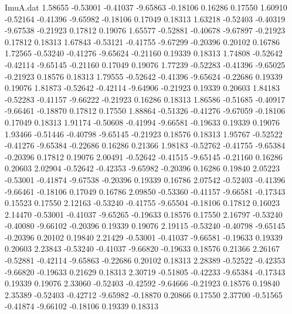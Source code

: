\begin{filecontents}{ImuA.dat}
   1.58655   -0.53001   -0.41037   -9.65863   -0.18106    0.16286    0.17550
   1.60910   -0.52164   -0.41396   -9.65982   -0.18106    0.17049    0.18313
   1.63218   -0.52403   -0.40319   -9.67538   -0.21923    0.17812    0.19076
   1.65577   -0.52881   -0.40678   -9.67897   -0.21923    0.17812    0.18313
   1.67843   -0.53121   -0.41755   -9.67299   -0.20396    0.20102    0.16786
   1.72565   -0.53240   -0.41276   -9.65624   -0.21160    0.19339    0.18313
   1.74808   -0.52642   -0.42114   -9.65145   -0.21160    0.17049    0.19076
   1.77239   -0.52283   -0.41396   -9.65025   -0.21923    0.18576    0.18313
   1.79555   -0.52642   -0.41396   -9.65624   -0.22686    0.19339    0.19076
   1.81873   -0.52642   -0.42114   -9.64906   -0.21923    0.19339    0.20603
   1.84183   -0.52283   -0.41157   -9.66222   -0.21923    0.16286    0.18313
   1.86586   -0.51685   -0.40917   -9.66461   -0.18870    0.17812    0.17550
   1.88864   -0.51326   -0.41276   -9.67059   -0.18106    0.17049    0.18313
   1.91174   -0.50608   -0.41994   -9.66581   -0.19633    0.19339    0.19076
   1.93466   -0.51446   -0.40798   -9.65145   -0.21923    0.18576    0.18313
   1.95767   -0.52522   -0.41276   -9.65384   -0.22686    0.16286    0.21366
   1.98183   -0.52762   -0.41755   -9.65384   -0.20396    0.17812    0.19076
   2.00491   -0.52642   -0.41515   -9.65145   -0.21160    0.16286    0.20603
   2.02904   -0.52642   -0.42353   -9.65982   -0.20396    0.16286    0.19840
   2.05223   -0.53001   -0.41874   -9.67538   -0.20396    0.19339    0.16786
   2.07542   -0.52403   -0.41396   -9.66461   -0.18106    0.17049    0.16786
   2.09850   -0.53360   -0.41157   -9.66581   -0.17343    0.15523    0.17550
   2.12163   -0.53240   -0.41755   -9.65504   -0.18106    0.17812    0.16023
   2.14470   -0.53001   -0.41037   -9.65265   -0.19633    0.18576    0.17550
   2.16797   -0.53240   -0.40080   -9.66102   -0.20396    0.19339    0.19076
   2.19115   -0.53240   -0.40798   -9.65145   -0.20396    0.20102    0.19840
   2.21429   -0.53001   -0.41037   -9.66581   -0.19633    0.19339    0.20603
   2.23843   -0.53240   -0.41037   -9.66820   -0.19633    0.18576    0.21366
   2.26167   -0.52881   -0.42114   -9.65863   -0.22686    0.20102    0.18313
   2.28389   -0.52522   -0.42353   -9.66820   -0.19633    0.21629    0.18313
   2.30719   -0.51805   -0.42233   -9.65384   -0.17343    0.19339    0.19076
   2.33060   -0.52403   -0.42592   -9.64666   -0.21923    0.18576    0.19840
   2.35389   -0.52403   -0.42712   -9.65982   -0.18870    0.20866    0.17550
   2.37700   -0.51565   -0.41874   -9.66102   -0.18106    0.19339    0.18313

\end{filecontents}
